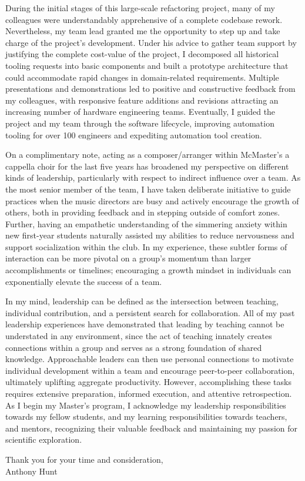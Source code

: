 \documentclass[11pt]{letter}
\begin{document}
During the initial stages of this large-scale refactoring project, many of my colleagues were understandably apprehensive of a complete codebase rework. Nevertheless, my team lead granted me the opportunity to step up and take charge of the project's development. Under his advice to gather team support by justifying the complete cost-value of the project, I decomposed all historical tooling requests into basic components and built a prototype architecture that could accommodate rapid changes in domain-related requirements. Multiple presentations and demonstrations led to positive and constructive feedback from my colleagues, with responsive feature additions and revisions attracting an increasing number of hardware engineering teams. Eventually, I guided the project and my team through the software lifecycle, improving automation tooling for over 100 engineers and expediting automation tool creation.

On a complimentary note, acting as a composer/arranger within McMaster's a cappella choir for the last five years has broadened my perspective on different kinds of leadership, particularly with respect to indirect influence over a team. As the most senior member of the team, I have taken deliberate initiative to guide practices when the music directors are busy and actively encourage the growth of others, both in providing feedback and in stepping outside of comfort zones. Further, having an empathetic understanding of the simmering anxiety within new first-year students naturally assisted my abilities to reduce nervousness and support socialization within the club. In my experience, these subtler forms of interaction can be more pivotal on a group's momentum than larger accomplishments or timelines; encouraging a growth mindset in individuals can exponentially elevate the success of a team.

In my mind, leadership can be defined as the intersection between teaching, individual contribution, and a persistent search for collaboration. All of my past leadership experiences have demonstrated that leading by teaching cannot be understated in any environment, since the act of teaching innately creates connections within a group and serves as a strong foundation of shared knowledge. Approachable leaders can then use personal connections to motivate individual development within a team and encourage peer-to-peer collaboration, ultimately uplifting aggregate productivity. However, accomplishing these tasks requires extensive preparation, informed execution, and attentive retrospection. As I begin my Master's program, I acknowledge my leadership responsibilities towards my fellow students, and my learning responsibilities towards teachers, and mentors, recognizing their valuable feedback and maintaining my passion for scientific exploration.

\setlength\parindent{0pt}

Thank you for your time and consideration,
\\
Anthony Hunt
\end{document}

